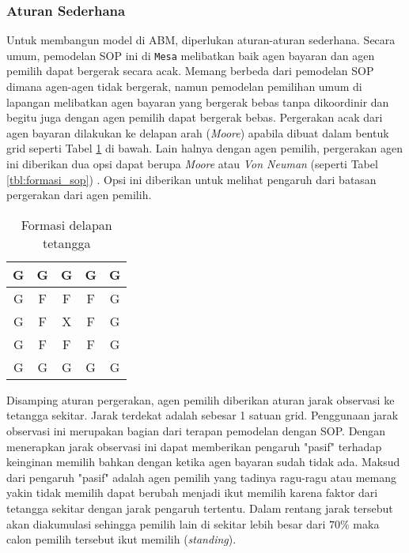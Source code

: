 \subsubsection{Aturan Sederhana}

Untuk membangun model di ABM, diperlukan aturan-aturan sederhana. Secara umum, pemodelan SOP ini di \texttt{Mesa} melibatkan baik agen bayaran dan agen pemilih dapat bergerak secara acak. Memang berbeda dari pemodelan SOP \cite{miller2004standing} dimana agen-agen tidak bergerak, namun pemodelan pemilihan umum di lapangan melibatkan agen bayaran yang bergerak bebas tanpa dikoordinir dan begitu juga dengan agen pemilih dapat bergerak bebas. Pergerakan acak dari agen bayaran dilakukan ke delapan arah (\textit{Moore}) apabila dibuat dalam bentuk grid seperti Tabel \ref{tbl:formasi_moore} di bawah. Lain halnya dengan agen pemilih, pergerakan agen ini diberikan dua opsi dapat berupa \textit{Moore} atau \textit{Von Neuman} (seperti Tabel \ref{tbl:formasi_sop}) \cite{zaitsev2017generalized}. Opsi ini diberikan untuk melihat pengaruh dari batasan pergerakan dari agen pemilih.

\begin{table}[H]
		\centering
		\begin{tabular}{|c|c|c|c|c|}
		\hline
		\cellcolor{gray!10}G & \cellcolor{gray!10}G & \cellcolor{gray!10}G & \cellcolor{gray!10}G & \cellcolor{gray!10}G \\
		\hline
		\cellcolor{gray!10}G & \cellcolor{gray!30}F & \cellcolor{gray!30}F & \cellcolor{gray!30}F & \cellcolor{gray!10}G \\
		\hline
		\cellcolor{gray!10}G & \cellcolor{gray!30}F & \cellcolor{gray!50}X & \cellcolor{gray!30}F & \cellcolor{gray!10}G \\
		\hline
		\cellcolor{gray!10}G & \cellcolor{gray!30}F & \cellcolor{gray!30}F & \cellcolor{gray!30}F & \cellcolor{gray!10}G \\
		\hline
		\cellcolor{gray!10}G & \cellcolor{gray!10}G & \cellcolor{gray!10}G & \cellcolor{gray!10}G & \cellcolor{gray!10}G \\
		\hline
		\end{tabular}
		\caption{Formasi delapan tetangga}
		\label{tbl:formasi_moore}
	\end{table}

Disamping aturan pergerakan, agen pemilih diberikan aturan jarak observasi ke tetangga sekitar. Jarak terdekat adalah sebesar 1 satuan grid. Penggunaan jarak observasi ini merupakan bagian dari terapan pemodelan dengan SOP. Dengan menerapkan jarak observasi ini dapat memberikan pengaruh "pasif" terhadap keinginan memilih bahkan dengan ketika agen bayaran sudah tidak ada. Maksud dari pengaruh "pasif" adalah agen pemilih yang tadinya ragu-ragu atau memang yakin tidak memilih dapat berubah menjadi ikut memilih karena faktor dari tetangga sekitar dengan jarak pengaruh tertentu. Dalam rentang jarak tersebut akan diakumulasi sehingga pemilih lain di sekitar lebih besar dari $70\%$ maka calon pemilih tersebut ikut memilih (\textit{standing}).

